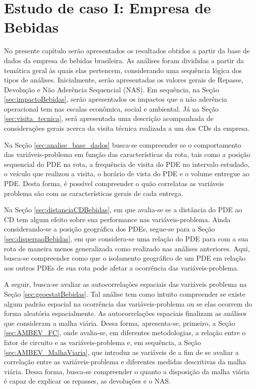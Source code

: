 \chapter{Estudo de caso I: Empresa de Bebidas} \label{sec:EstCasoBebidas}

No presente capítulo serão apresentados os resultados obtidos a partir da base de dados da empresa de bebidas brasileira.
As análises foram divididas a partir da temática geral às quais elas pertencem, considerando uma sequência lógica dos tipos de análises.
Inicialmente, serão apresentadas os valores gerais de Repasse, Devolução e Não Aderência Sequencial (NAS).
Em sequência, na Seção \ref{sec:impactoBebidas}, serão apresentados os impactos que a não aderência operacional tem nas escalas econômica, social e ambiental.
Já na Seção \ref{sec:visita_tecnica}, será apresentada uma descrição acompanhada de considerações gerais acerca da visita técnica realizada a um dos CDs da empresa.

Na Seção \ref{sec:analise_base_dados} busca-se compreender se o comportamento das variáveis-problema em função das características da rota, tais como a posição sequencial do PDE na rota, a frequência de visita do PDE no intervalo estudado, o veículo que realizou a visita, o horário de vista do PDE e o volume entregue ao PDE.
Desta forma, é possível compreender o quão correlatas as variáveis problema são com as características gerais de cada entrega.

Na Seção \ref{sec:distanciaCDBebidas}, em que avalia-se se a distância do PDE ao CD tem algum efeito sobre sua performance nas variáveis-problema.
Ainda considerando-se a posição geográfica dos PDEs, segue-se para a Seção \ref{sec:dispersaoBebidas}, em que considera-se uma relação do PDE para com a sua rota de maneira menos generalizada como realizado nas análises anteriores.
Aqui, busca-se compreender como que o isolamento geográfico de um PDE em relação aos outros PDEs de sua rota pode afetar a ocorrência das variáveis-problema.

A seguir, busca-se avaliar as autocorrelações espaciais das variáveis problema na Seção \ref{sec:geoestatBebidas}.
Tal análise tem como intuito compreender se existe algum padrão espacial na ocorrência das variáveis-problema ou se elas ocorrem do forma aleatória espacialmente. 
As autocorrelações espaciais finalizam as análises que consideram a malha viária. 
Dessa forma, apresenta-se, primeiro, a Seção \ref{sec:AMBEV_FC}, onde avalia-se, em diferentes metodologias, a relação entre o fator de circuito e as variáveis-problema e, em sequência, a Seção \ref{sec:AMBEV_MalhaViaria}, que introduz as variáveis de  a fim de se avaliar a correlação entre as variáveis-problema e diferentes medidas descritivas da malha viária.
Dessa forma, busca-se compreender o quanto a disposição da malha viária é capaz de explicar os repasses, as devoluções e o NAS.


